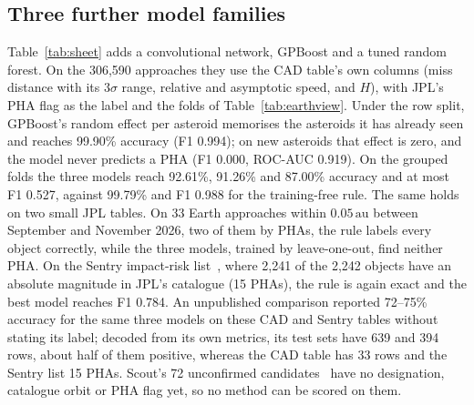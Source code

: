 \documentclass[make,article,submit,moreauthors]{Definitions/mdpi}
\newcommand{\au}{\,\mathrm{au}}
\begin{document}
\subsection{Three further model families}
Table~\ref{tab:sheet} adds a convolutional network, GPBoost and a tuned random forest. On the 306,590 approaches they use the CAD table's own columns (miss distance with its $3\sigma$ range, relative and asymptotic speed, and $H$), with JPL's PHA flag as the label and the folds of Table~\ref{tab:earthview}. Under the row split, GPBoost's random effect per asteroid memorises the asteroids it has already seen and reaches 99.90\% accuracy (F1 0.994); on new asteroids that effect is zero, and the model never predicts a PHA (F1 0.000, ROC-AUC 0.919). On the grouped folds the three models reach 92.61\%, 91.26\% and 87.00\% accuracy and at most F1 0.527, against 99.79\% and F1 0.988 for the training-free rule. The same holds on two small JPL tables. On 33 Earth approaches within $0.05\au$ between September and November 2026, two of them by PHAs, the rule labels every object correctly, while the three models, trained by leave-one-out, find neither PHA. On the Sentry impact-risk list~\cite{jpl_sentry_api}, where 2,241 of the 2,242 objects have an absolute magnitude in JPL's catalogue (15 PHAs), the rule is again exact and the best model reaches F1 0.784. An unpublished comparison reported 72--75\% accuracy for the same three models on these CAD and Sentry tables without stating its label; decoded from its own metrics, its test sets have 639 and 394 rows, about half of them positive, whereas the CAD table has 33 rows and the Sentry list 15 PHAs. Scout's 72 unconfirmed candidates~\cite{jpl_scout_api} have no designation, catalogue orbit or PHA flag yet, so no method can be scored on them.
\end{document}
